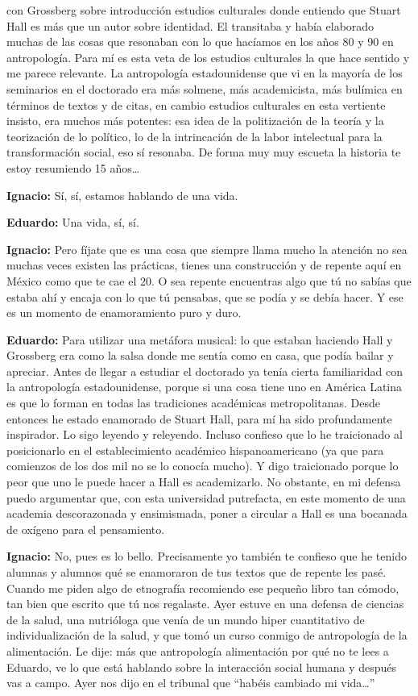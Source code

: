 \documentclass[
]{interact}
\begin{document}
con Grossberg sobre introducción estudios culturales donde entiendo que
Stuart Hall es más que un autor sobre identidad. El transitaba y había
elaborado muchas de las cosas que resonaban con lo que hacíamos en los
años 80 y 90 en antropología. Para mí es esta veta de los estudios
culturales la que hace sentido y me parece relevante. La antropología
estadounidense que vi en la mayoría de los seminarios en el doctorado
era más solmene, más academicista, más bulímica en términos de textos y
de citas, en cambio estudios culturales en esta vertiente insisto, era
muchos más potentes: esa idea de la politización de la teoría y la
teorización de lo político, lo de la intrincación de la labor
intelectual para la transformación social, eso sí resonaba. De forma muy
muy escueta la historia te estoy resumiendo 15 años\ldots{}

\textbf{Ignacio:} Sí, sí, estamos hablando de una vida.

\textbf{Eduardo:} Una vida, sí, sí.

\textbf{Ignacio:} Pero fíjate que es una cosa que siempre llama mucho la
atención no sea muchas veces existen las prácticas, tienes una
construcción y de repente aquí en México como que te cae el 20. O sea
repente encuentras algo que tú no sabías que estaba ahí y encaja con lo
que tú pensabas, que se podía y se debía hacer. Y ese es un momento de
enamoramiento puro y duro.

\textbf{Eduardo:} Para utilizar una metáfora musical: lo que estaban
haciendo Hall y Grossberg era como la salsa donde me sentía como en
casa, que podía bailar y apreciar. Antes de llegar a estudiar el
doctorado ya tenía cierta familiaridad con la antropología
estadounidense, porque si una cosa tiene uno en América Latina es que lo
forman en todas las tradiciones académicas metropolitanas. Desde
entonces he estado enamorado de Stuart Hall, para mí ha sido
profundamente inspirador. Lo sigo leyendo y releyendo. Incluso confieso
que lo he traicionado al posicionarlo en el establecimiento académico
hispanoamericano (ya que para comienzos de los dos mil no se lo conocía
mucho). Y digo traicionado porque lo peor que uno le puede hacer a Hall
es academizarlo. No obstante, en mi defensa puedo argumentar que, con
esta universidad putrefacta, en este momento de una academia
descorazonada y ensimismada, poner a circular a Hall es una bocanada de
oxígeno para el pensamiento.

\textbf{Ignacio:} No, pues es lo bello. Precisamente yo también te
confieso que he tenido alumnas y alumnos qué se enamoraron de tus textos
que de repente les pasé. Cuando me piden algo de etnografía recomiendo
ese pequeño libro tan cómodo, tan bien que escrito que tú nos regalaste.
Ayer estuve en una defensa de ciencias de la salud, una nutrióloga que
venía de un mundo hiper cuantitativo de individualización de la salud, y
que tomó un curso conmigo de antropología de la alimentación. Le dije:
más que antropología alimentación por qué no te lees a Eduardo, ve lo
que está hablando sobre la interacción social humana y después vas a
campo. Ayer nos dijo en el tribunal que ``habéis cambiado mi
vida\ldots{}''
\end{document}
